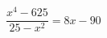 \begin{ex}[type=equation]
	\begin{condition}
		$\dfrac{x^4 - 625}{25 - x^2} = 8x - 90$
	\end{condition}
\end{ex}